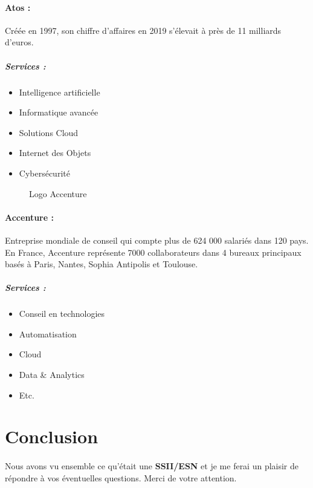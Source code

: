 \documentclass{article}
\begin{document}
\paragraph{Atos :}
Créée en 1997, son chiffre d'affaires en 2019 s'élevait à près de 11 milliards d'euros.
  \subparagraph{Services :}
  \begin{itemize}
    \item Intelligence artificielle
    \item Informatique avancée
    \item Solutions Cloud
    \item Internet des Objets
    \item Cybersécurité
  \end{itemize}

\begin{figure}[H]
  \caption{Logo Accenture}
\end{figure}

\paragraph{Accenture :}
Entreprise mondiale de conseil qui compte plus de 624 000 salariés dans 120 pays. En France, Accenture représente 7000 collaborateurs dans 4 bureaux principaux basés à Paris, Nantes, Sophia Antipolis et Toulouse.

\subparagraph{Services :}
  \begin{itemize}
    \item Conseil en technologies
    \item Automatisation
    \item Cloud
    \item Data {\&} Analytics
    \item Etc.
  \end{itemize}

\section{Conclusion}
\paragraph{}
Nous avons vu ensemble ce qu'était une \textbf{SSII/ESN} et je me ferai un plaisir de répondre à vos éventuelles questions. Merci de votre attention.
\end{document}
